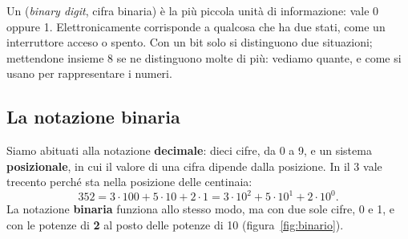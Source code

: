 \begin{affianco}[0.5][c]
\begin{immagine}
\end{immagine}
\risultato
Un  (\textit{binary digit}, cifra binaria) è la più piccola unità
di informazione: vale 0 oppure 1. Elettronicamente corrisponde a qualcosa
che ha due stati, come un interruttore acceso o spento. Con un bit solo si
distinguono due situazioni; mettendone insieme 8 se ne distinguono molte di
più: vediamo quante, e come si usano per rappresentare i numeri.
\end{affianco}

\subsection{La notazione binaria}

Siamo abituati alla notazione \textbf{decimale}: dieci cifre, da 0 a 9, e
un sistema \textbf{posizionale}, in cui il valore di una cifra dipende dalla
posizione. In  il 3 vale trecento perché sta nella posizione delle
centinaia:
\[
  352 = 3 \cdot 100 + 5 \cdot 10 + 2 \cdot 1 = 3 \cdot 10^2 + 5 \cdot 10^1 + 2 \cdot 10^0 .
\]
La notazione \textbf{binaria} funziona allo stesso modo, ma con due sole
cifre, 0 e 1, e con le potenze di \textbf{2} al posto delle potenze di 10
(figura~\ref{fig:binario}).

